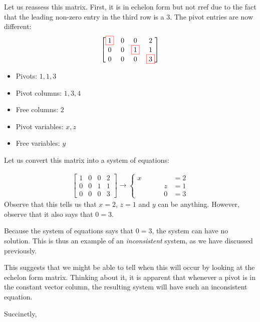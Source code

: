 \documentclass[11pt]{article}
\newcommand{\boxit}[2]{\textcolor{#1}{\boxed{\textcolor{black}{#2}}}}
\begin{document}
Let us reassess this matrix. First, it is in echelon form but not rref due to the fact that the leading non-zero entry in the third row is a $3$. The pivot entries are now different:
\begin{align*}
\left[
\begin{matrix}
\boxit{red}{1} & 0 & 0 & 2
\\
0 & 0 & \boxit{red}{1} & 1
\\
0 & 0 & 0 & \boxit{red}{3}
\end{matrix}
\right]
\end{align*}
\begin{itemize}
\item{
Pivots: $1,1,3$
}
\item{
Pivot columns: $1,3,4$
}
\item{
Free columns: $2$
}
\item{
Pivot variables: $x,z$
}
\item{
Free variables: $y$
}
\end{itemize}

Let us convert this matrix into a system of equations:

\begin{align*}
\left[
\begin{matrix}
1 & 0 & 0 & 2
\\
0 & 0 & 1 & 1
\\
0 & 0 & 0 & 3
\end{matrix}
\right]
\longrightarrow
\left\{
\begin{aligned}
x && && &= 2
\\
&& && z &= 1
\\
&& && 0 &= 3
\end{aligned}
\right.
\end{align*}
Observe that this tells us that $x=2$, $z=1$ and $y$ can be anything. However, observe that it also says that $0=3$.

Because the system of equations says that $0=3$, the system can have no solution. This is thus an example of an \emph{inconsistent} system, as we have discussed previously.

This suggests that we might be able to tell when this will occur by looking at the echelon form matrix. Thinking about it, it is apparent that whenever a pivot is in the constant vector column, the resulting system will have such an inconsistent equation.


Succinctly,
\end{document}
